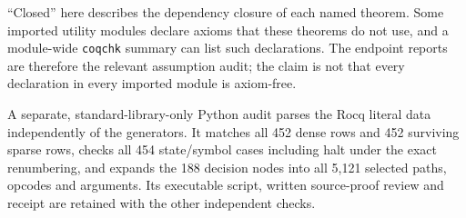 ``Closed'' here describes the dependency closure of each named theorem.
Some imported utility modules declare axioms that these theorems do not
use, and a module-wide \texttt{coqchk} summary can list such declarations.
The endpoint reports are therefore the relevant assumption audit; the
claim is not that every declaration in every imported module is axiom-free.

A separate, standard-library-only Python audit parses the Rocq literal
data independently of the generators. It matches all 452 dense rows and
452 surviving sparse rows, checks all 454 state/symbol cases including
halt under the exact renumbering, and expands the 188 decision nodes into
all 5,121 selected paths, opcodes and arguments. Its executable script,
written source-proof review and receipt are retained with the other
independent checks.
